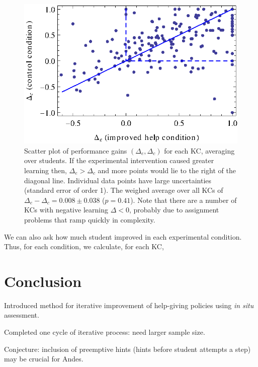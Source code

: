 \documentclass{edm_template}
\begin{document}
\begin{figure}
   \centering\includegraphics{scatter-gain.eps}
   \caption{Scatter plot of performance gains $\left(\Delta_e,\Delta_c\right)$
   for each KC, averaging over students.  If the experimental intervention
   caused greater learning then, $\Delta_e > \Delta_c$ and more points
   would lie to the right of the diagonal line.
   Individual data points have large 
   uncertainties (standard error of order 1).
   The weighed average over all KCs of $\Delta_e - \Delta_c = 
        0.008\pm 0.038$ ($p=0.41$).
   Note that there are a number
   of KCs with negative learning $\Delta<0$, probably due to 
   assignment problems that ramp quickly in complexity. 
   }\label{scattergain}
\end{figure}

We can also ask how much student improved in each experimental condition.
Thus, for each condition, we calculate, for each KC, 

\section{Conclusion}

Introduced method for iterative improvement of help-giving policies using 
{\em in situ} assessment.

Completed one cycle of iterative process:  need larger sample size.

Conjecture: inclusion of preemptive hints (hints before student attempts
a step) may be crucial for Andes. 



\end{document}
